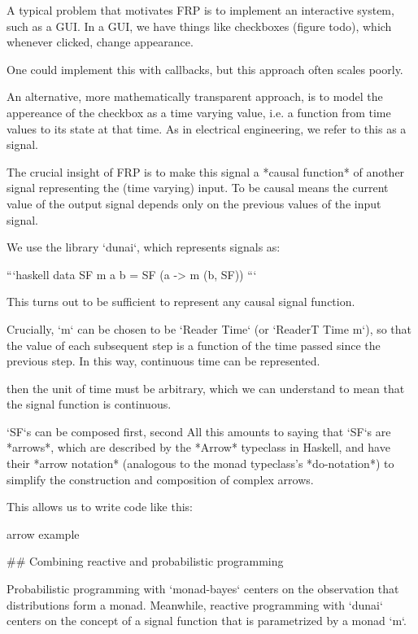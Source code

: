 A typical problem that motivates FRP is to implement an interactive system, such as a GUI. In a GUI, we have things like checkboxes (figure todo), which whenever clicked, change appearance.

One could implement this with callbacks, but this approach often scales poorly.

An alternative, more mathematically transparent approach, is to model the appereance of the checkbox as a time varying value, i.e. a function from time values to its state at that time. As in electrical engineering, we refer to this as a signal.

The crucial insight of FRP is to make this signal a *causal function* of another signal representing the (time varying) input. To be causal means the current value of the output signal depends only on the previous values of the input signal.

We use the library `dunai`, which represents signals as:

```haskell
data SF m a b = SF (a -> m (b, SF))
```

This turns out to be sufficient to represent any causal signal function.

Crucially, `m` can be chosen to be `Reader Time` (or `ReaderT Time m`), so that the value of each subsequent step is a function of the time passed since the previous step. In this way, continuous time can be represented.





then the unit of time must be arbitrary, which we can understand to mean that the signal function is continuous.

`SF`s can be composed 
    first, second
All this amounts to saying that `SF`s are *arrows*, which are described by the *Arrow* typeclass in Haskell, and have their *arrow notation* (analogous to the monad typeclass's *do-notation*) to simplify the construction and composition of complex arrows.

This allows us to write code like this:

arrow example



## Combining reactive and probabilistic programming

Probabilistic programming with `monad-bayes` centers on the observation that distributions form a monad. Meanwhile, reactive programming with `dunai` centers on the concept of a signal function that is parametrized by a monad `m`.

